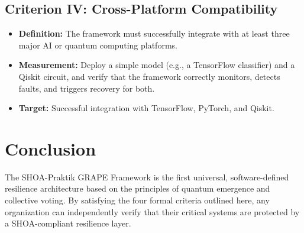 \documentclass[12pt]{article}
\begin{document}
\subsection{Criterion IV: Cross-Platform Compatibility}
\begin{itemize}
    \item \textbf{Definition:} The framework must successfully integrate with at least three major AI or quantum computing platforms.
    \item \textbf{Measurement:} Deploy a simple model (e.g., a TensorFlow classifier) and a Qiskit circuit, and verify that the framework correctly monitors, detects faults, and triggers recovery for both.
    \item \textbf{Target:} Successful integration with TensorFlow, PyTorch, and Qiskit.
\end{itemize}

\section{Conclusion}
The SHOA-Praktik GRAPE Framework is the first universal, software-defined resilience architecture based on the principles of quantum emergence and collective voting. By satisfying the four formal criteria outlined here, any organization can independently verify that their critical systems are protected by a SHOA-compliant resilience layer.
\end{document}

